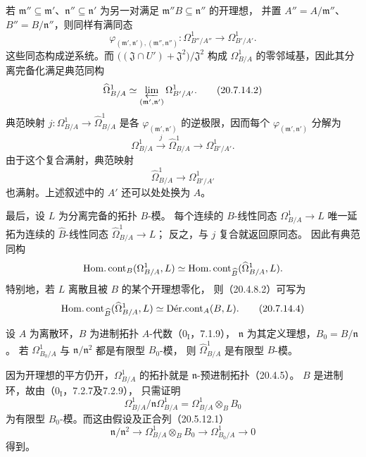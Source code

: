 若 $\mathfrak m''\subseteq\mathfrak m'$、$\mathfrak n''\subseteq\mathfrak n'$
为另一对满足 $\mathfrak m''B\subseteq\mathfrak n''$ 的开理想，
并置 $A''=A/\mathfrak m''$、$B''=B/\mathfrak n''$，则同样有满同态
\[
 \varphi_{(\mathfrak m',\mathfrak n'),(\mathfrak m'',\mathfrak n'')}:
 \Omega^1_{B''/A''}\longrightarrow\Omega^1_{B'/A'} .
\]
这些同态构成逆系统。而
$\bigl((\mathfrak J\cap U')+\mathfrak J^2\bigr)/\mathfrak J^2$
构成 $\Omega^1_{B/A}$ 的零邻域基，因此其分离完备化满足典范同构
\begin{equation}
 \widehat{\Omega}^1_{B/A}
 \simeq\varprojlim_{(\mathfrak m',\mathfrak n')}\Omega^1_{B'/A'} .
 \tag{20.7.14.2}
\end{equation}
典范映射 $j:\Omega^1_{B/A}\to\widehat{\Omega}^1_{B/A}$ 是各
$\varphi_{(\mathfrak m',\mathfrak n')}$ 的逆极限，因而每个
$\varphi_{(\mathfrak m',\mathfrak n')}$ 分解为
\[
 \Omega^1_{B/A}\xrightarrow{j}\widehat{\Omega}^1_{B/A}
 \longrightarrow\Omega^1_{B'/A'} .
\]
由于这个复合满射，典范映射
\begin{equation}
 \widehat{\Omega}^1_{B/A}\longrightarrow\Omega^1_{B'/A'}
 \tag{20.7.14.3}
\end{equation}
也满射。上述叙述中的 $A'$ 还可以处处换为 $A$。

最后，设 $L$ 为分离完备的拓扑 $B$-模。
每个连续的 $B$-线性同态 $\Omega^1_{B/A}\to L$ 唯一延拓为连续的
$\widehat B$-线性同态 $\widehat{\Omega}^1_{B/A}\to L$；
反之，与 $j$ 复合就返回原同态。
因此有典范同构
\[
 \HomCont_B(\Omega^1_{B/A},L)
 \simeq\HomCont_{\widehat B}(\widehat{\Omega}^1_{B/A},L).
\]
特别地，若 $L$ 离散且被 $B$ 的某个开理想零化，
则（20.4.8.2）可写为
\begin{equation}
 \HomCont_{\widehat B}(\widehat{\Omega}^1_{B/A},L)
 \simeq\DerCont_A(B,L).
 \tag{20.7.14.4}
\end{equation}

设 $A$ 为离散环，$B$ 为进制拓扑 $A$-代数（$0_{\mathrm I}$，7.1.9），
$\mathfrak n$ 为其定义理想，$B_0=B/\mathfrak n$。
若 $\Omega^1_{B_0/A}$ 与 $\mathfrak n/\mathfrak n^2$ 都是有限型 $B_0$-模，
则 $\widehat{\Omega}^1_{B/A}$ 是有限型 $B$-模。

因为开理想的平方仍开，$\Omega^1_{B/A}$ 的拓扑就是
$\mathfrak n$-预进制拓扑（20.4.5）。
$B$ 是进制环，故由（$0_{\mathrm I}$，7.2.7及7.2.9），
只需证明
\[
 \Omega^1_{B/A}/\mathfrak n\Omega^1_{B/A}
 =\Omega^1_{B/A}\otimes_B B_0
\]
为有限型 $B_0$-模。而这由假设及正合列（20.5.12.1）
\[
 \mathfrak n/\mathfrak n^2\longrightarrow
 \Omega^1_{B/A}\otimes_B B_0\longrightarrow
 \Omega^1_{B_0/A}\longrightarrow0
\]
得到。

